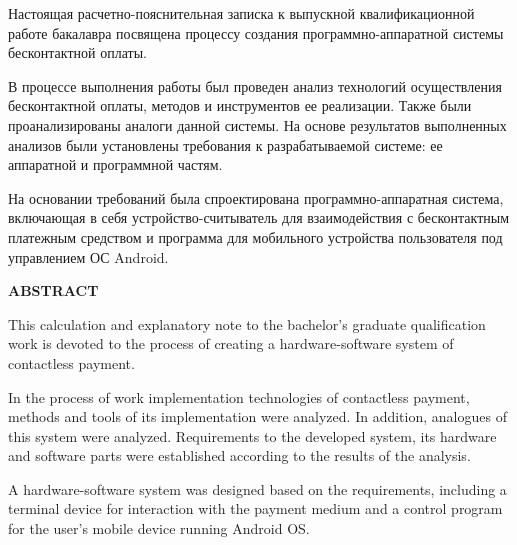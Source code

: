 \newpage


Настоящая расчетно-пояснительная записка к выпускной квалификационной работе бакалавра посвящена процессу создания программно-аппаратной системы бесконтактной оплаты.

В процессе выполнения работы был проведен анализ технологий осуществления бесконтактной оплаты, методов и инструментов ее реализации. 
Также были проанализированы аналоги данной системы.
На основе результатов выполненных анализов были установлены требования к разрабатываемой системе: ее аппаратной и программной частям.

На основании требований была спроектирована программно-аппаратная система, включающая в себя устройство-считыватель для взаимодействия с бесконтактным платежным средством и программа для мобильного устройства пользователя под управлением ОС Android.

\begin{center}
  \textbf{ABSTRACT}
\end{center}

This calculation and explanatory note to the bachelor's graduate qualification work is devoted to the process of creating a hardware-software system of contactless payment.

In the process of work implementation technologies of contactless payment, methods and tools of its implementation were analyzed. 
In addition, analogues of this system were analyzed.
Requirements to the developed system, its hardware and software parts were established according to the results of the analysis.

A hardware-software system was designed based on the requirements, including a terminal device for interaction with the payment medium and a control program for the user's mobile device running Android OS.